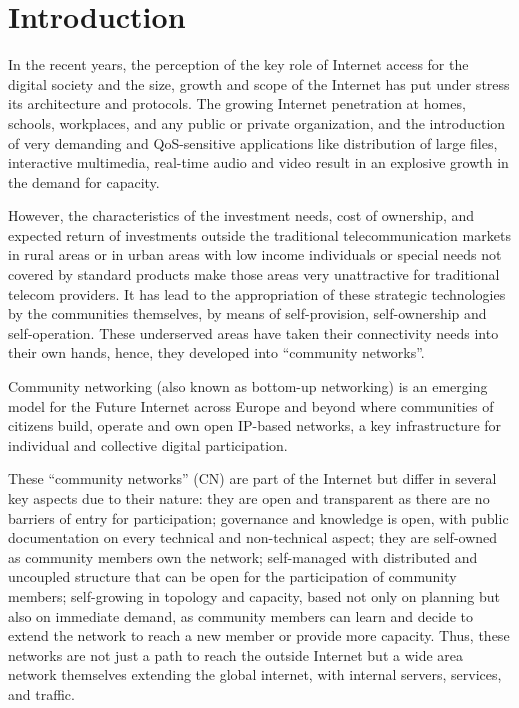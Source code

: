 \documentclass[conference]{IEEEtran}
\begin{document}
\section{Introduction}
\label{sec:intro}

In the recent years, the perception of the key role of Internet access for the
digital society and the size, growth and scope of the Internet has put under stress
its architecture and protocols. The growing Internet penetration at homes, schools,
workplaces, and any public or private organization, and the introduction of very demanding
and QoS-sensitive applications like distribution of large files, interactive multimedia,
real-time audio and video result in an explosive growth in the demand for capacity.

However, the characteristics of the investment needs, cost of ownership, and expected return
of investments outside the traditional telecommunication markets in rural areas or in 
urban areas with low income individuals or special needs not covered by standard products
make those areas very unattractive for traditional telecom providers. It has lead to the
appropriation of these strategic technologies by the communities themselves, by means of
self-provision, self-ownership and self-operation. These underserved areas have taken their
connectivity needs into their own hands, hence, they developed into ``community networks''.

Community networking (also known as bottom-up networking) is an emerging model 
for the Future Internet across Europe and beyond where communities
of citizens build, operate and own open IP-based networks, a key infrastructure
for individual and collective digital participation.

These ``community networks'' (CN) are part of the Internet but differ in several key
aspects due to their nature: they are open and transparent as there are no barriers of entry
for participation; governance and knowledge is open, with public documentation on
every technical and non-technical aspect; they are self-owned as community members
own the network; self-managed with distributed and uncoupled structure that can be open
for the participation of community members; self-growing in topology and capacity, based not only
on planning but also on immediate demand, as community members can learn and decide to extend the network
to reach a new member or provide more capacity. Thus, these networks are not just
a path to reach the outside Internet but a 
wide area network themselves extending the global internet, with internal servers, services, and traffic. 
\end{document}
